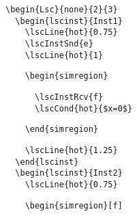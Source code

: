 \documentclass{article}
\begin{document}
\begin{center}%
\begin{minipage}{0.5\textwidth}
\end{minipage}
\hfill
\begin{minipage}{0.36\textwidth}%
\small%
{\gray\begin{verbatim}
\begin{Lsc}{none}{2}{3}
  \begin{lscinst}{Inst1}
    \lscLine{hot}{0.75}
    \lscInstSnd{e}
    \lscLine{hot}{1}
\end{verbatim}}%
\verbunskip%
{\begin{verbatim}
    \begin{simregion}
\end{verbatim}}%
\verbunskip%
{\gray\begin{verbatim}
      \lscInstRcv{f}
      \lscCond{hot}{$x=0$}
\end{verbatim}}%
\verbunskip%
{\begin{verbatim}
    \end{simregion}
\end{verbatim}}%
\verbunskip%
{\gray\begin{verbatim}
    \lscLine{hot}{1.25}
  \end{lscinst}
  \begin{lscinst}{Inst2}
    \lscLine{hot}{0.75}
\end{verbatim}}%
\verbunskip%
{\begin{verbatim}
    \begin{simregion}[f]
\end{verbatim}}%

\end{minipage}
\end{center}
\end{document}
